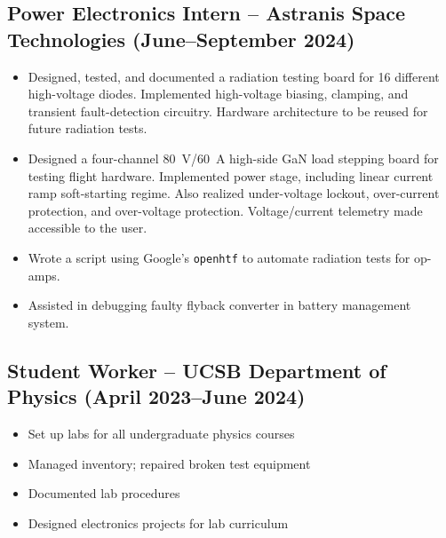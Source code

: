 	\subsection{Power Electronics Intern -- Astranis Space Technologies (June--September 2024)}
	\begin{itemize}[topsep=0em,itemsep=0em]
		\item Designed, tested, and documented a radiation testing board for 16 different high-voltage diodes. Implemented high-voltage biasing, clamping, and transient fault-detection circuitry. Hardware architecture to be reused for future radiation tests.
		\item Designed a four-channel \qty{80}{\volt}/\qty{60}{\ampere} high-side GaN load stepping board for testing flight hardware. Implemented power stage, including linear current ramp soft-starting regime. Also realized under-voltage lockout, over-current protection, and over-voltage protection. Voltage/current telemetry made accessible to the user.
		\item Wrote a script using Google's \texttt{openhtf} to automate radiation tests for op-amps.
		\item Assisted in debugging faulty flyback converter in battery management system.
	\end{itemize}
	\subsection{Student Worker -- UCSB Department of Physics (April 2023--June 2024)}
	\begin{center}
		\begin{minipage}{0.5\textwidth}
			\begin{itemize}[topsep=0em,itemsep=0em]
				\item Set up labs for all undergraduate physics courses
				\item Managed inventory; repaired broken test equipment
			\end{itemize}
		\end{minipage}%
		\begin{minipage}{0.5\textwidth}
			\begin{itemize}[topsep=0em,itemsep=0em]
				\item Documented lab procedures
				\item Designed electronics projects for lab curriculum
			\end{itemize}
		\end{minipage}
	\end{center}


